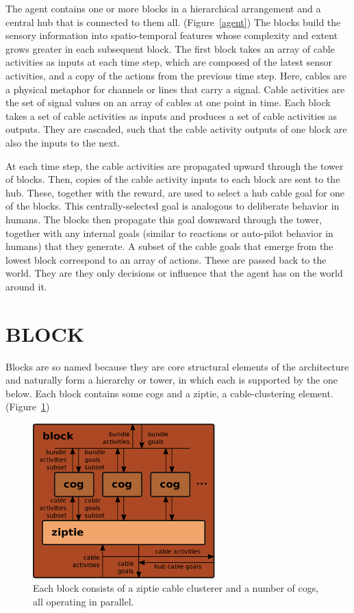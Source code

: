 \documentclass[oneside,twocolumn]{article}
\begin{document}
The agent contains one or more blocks in a hierarchical arrangement and a central hub that is connected to them all. (Figure~\ref{agent}) The blocks build the sensory information into spatio-temporal features whose complexity and extent grows greater in each subsequent block. The first block takes an array of cable activities as inputs at each time step, which are composed of the latest sensor activities, and a copy of the actions from the previous time step. Here, cables are a physical metaphor for channels or lines that carry a signal. Cable activities are the set of signal values on an array of cables at one point in time. Each block takes a set of cable activities as inputs and produces a set of cable activities as outputs. They are cascaded, such that the cable activity outputs of one block are also the inputs to the next.

At each time step, the cable activities are propagated upward through the tower of blocks. Then, copies of the cable activity inputs to each block are sent to the hub. These, together with the reward, are used to select a hub cable goal for one of the blocks. This centrally-selected goal is analogous to deliberate behavior in humans. The blocks then propagate this goal downward through the tower, together with any internal goals (similar to reactions or auto-pilot behavior in humans) that they generate. A subset of the cable goals that emerge from the lowest block correspond to an array of actions. These are passed back to the world. They are they only decisions or influence that the agent has on the world around it.

\section*{\color{copper} BLOCK}

Blocks are so named because they are core structural elements of the architecture and naturally form a hierarchy or tower, in which each is supported by the one below. Each block contains some cogs and a ziptie, a cable-clustering element. (Figure~\ref{block}) 

\begin{figure}[ht]
\centering
\includegraphics[height=6.0cm]{figs/blocks.png}
\caption{Each block consists of a ziptie cable clusterer and a number of cogs, all operating in parallel.}
\label{block}
\end{figure}
\end{document}
